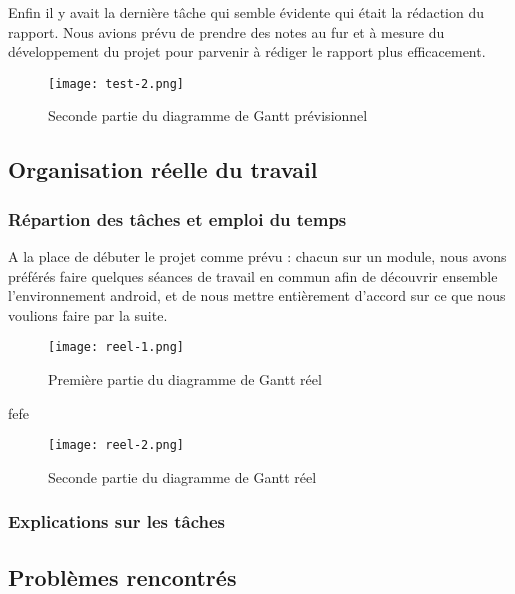 \par
Enfin il y avait la dernière tâche qui semble évidente qui était la rédaction du rapport. Nous avions prévu de prendre des notes au fur et à mesure du développement du projet pour parvenir à rédiger le rapport plus efficacement.
\vfill
\begin{figure}[!h]
    \begin{center}
        \texttt{[image: test-2.png]}
        \caption{Seconde partie du diagramme de Gantt prévisionnel}
    \end{center}
\end{figure}






\subsection{Organisation réelle du travail}
\subsubsection{Répartion des tâches et emploi du temps}
    A la place de débuter le projet comme prévu : chacun sur un module, nous avons préférés faire quelques séances de travail en commun afin de découvrir ensemble l'environnement android, et de nous mettre entièrement d'accord sur ce que nous voulions faire par la suite.
\par
\vfill
\begin{figure}[!h]
    \begin{center}
        \texttt{[image: reel-1.png]}
        \caption{Première partie du diagramme de Gantt réel}
    \end{center}
\end{figure}
\newpage
fefe
\vfill
\begin{figure}[!h]
    \begin{center}
        \texttt{[image: reel-2.png]}
        \caption{Seconde partie du diagramme de Gantt réel}
    \end{center}
\end{figure}
\newpage
\subsubsection{Explications sur les tâches}




\subsection{Problèmes rencontrés}

